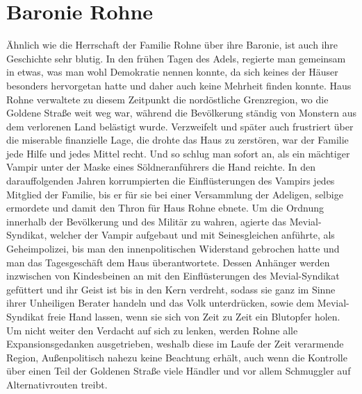 \documentclass[a4paper,12pt,oneside]{book}
\begin{document}
\section{Baronie Rohne}
Ähnlich wie die Herrschaft der Familie Rohne über ihre Baronie, ist auch ihre Geschichte sehr blutig. In den frühen Tagen des Adels, regierte man gemeinsam in etwas, was man wohl Demokratie nennen konnte, da sich keines der Häuser besonders hervorgetan hatte und daher auch keine Mehrheit finden konnte. Haus Rohne verwaltete zu diesem Zeitpunkt die nordöstliche Grenzregion, wo die Goldene Straße weit weg war, während die Bevölkerung ständig von Monstern aus dem verlorenen Land belästigt wurde. Verzweifelt und später auch frustriert über die miserable finanzielle Lage, die drohte das Haus zu zerstören, war der Familie jede Hilfe und jedes Mittel recht. Und so schlug man sofort an, als ein mächtiger Vampir unter der Maske eines Söldneranführers die Hand reichte. In den darauffolgenden Jahren korrumpierten die Einflüsterungen des Vampirs jedes Mitglied der Familie, bis er für sie bei einer Versammlung der Adeligen, selbige ermordete und damit den Thron für Haus Rohne ebnete. Um die Ordnung innerhalb der Bevölkerung und des Militär zu wahren, agierte das Mevial-Syndikat, welcher der Vampir aufgebaut und mit Seinesgleichen anführte, als Geheimpolizei, bis man den innenpolitischen Widerstand gebrochen hatte und man das Tagesgeschäft dem Haus überantwortete. Dessen Anhänger werden inzwischen von Kindesbeinen an mit den Einflüsterungen des Mevial-Syndikat gefüttert und ihr Geist ist bis in den Kern verdreht, sodass sie ganz im Sinne ihrer Unheiligen Berater handeln und das Volk unterdrücken, sowie dem Mevial-Syndikat freie Hand lassen, wenn sie sich von Zeit zu Zeit ein Blutopfer holen. Um nicht weiter den Verdacht auf sich zu lenken, werden Rohne alle Expansionsgedanken ausgetrieben, weshalb diese im Laufe der Zeit verarmende Region, Außenpolitisch nahezu keine Beachtung erhält, auch wenn die Kontrolle über einen Teil der Goldenen Straße viele Händler und vor allem Schmuggler auf Alternativrouten treibt.
\end{document}
